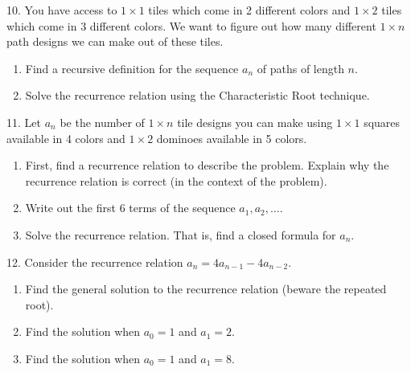 \documentclass[10pt,]{book}
\theoremstyle{plain}
\theoremstyle{definition}
\numberwithin{equation}{chapter}
\begin{document}
\begin{exerciselist}
\par\smallskip
\item[10.]\hypertarget{exercise-181}{}
                You have access to \(1 \times 1\) tiles which come in 2 different colors and \(1\times 2\) tiles which come in 3 different colors. We want to figure out how many different \(1 \times n\) path designs we can make out of these tiles.
\leavevmode%
\begin{enumerate}[label=(\alph*)]
\item\hypertarget{li-581}{}
                    Find a recursive definition for the sequence \(a_n\) of paths of length \(n\).
\item\hypertarget{li-582}{}
                    Solve the recurrence relation using the Characteristic Root technique.
\end{enumerate}
\par\smallskip
\item[11.]\hypertarget{exercise-182}{}
                      Let \(a_n\) be the number of \(1 \times n\) tile designs you can make using \(1 \times 1\) squares available in 4 colors and \(1 \times 2\) dominoes available in 5 colors.
\leavevmode%
\begin{enumerate}[label=(\alph*)]
\item\hypertarget{li-583}{}
                          First, find a recurrence relation to describe the problem. Explain why the recurrence relation is correct (in the context of the problem).


\item\hypertarget{li-584}{}
                          Write out the first 6 terms of the sequence \(a_1, a_2, \ldots\).


\item\hypertarget{li-585}{}
                          Solve the recurrence relation. That is, find a closed formula for \(a_n\).


\end{enumerate}
\par\smallskip
\item[12.]\hypertarget{exercise-183}{}
                      Consider the recurrence relation \(a_n = 4a_{n-1} - 4a_{n-2}\).
\leavevmode%
\begin{enumerate}[label=(\alph*)]
\item\hypertarget{li-586}{}
                          Find the general solution to the recurrence relation (beware the repeated root).


\item\hypertarget{li-587}{}
                          Find the solution when \(a_0 = 1\) and \(a_1 = 2\).


\item\hypertarget{li-588}{}
                          Find the solution when \(a_0 = 1\) and \(a_1 = 8\).


\end{enumerate}
\par\smallskip
\end{exerciselist}
\end{document}
